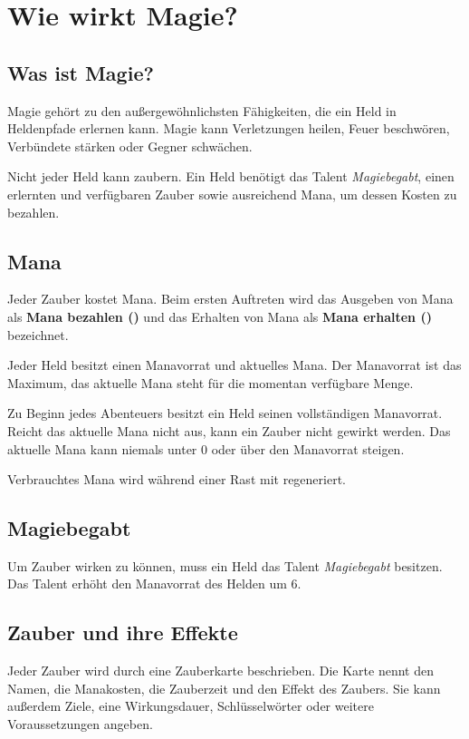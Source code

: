 \chapter{Wie wirkt Magie?}
\label{chap:magic}

\section{Was ist Magie?}

Magie gehört zu den außergewöhnlichsten Fähigkeiten, die ein Held in Heldenpfade erlernen kann. Magie kann Verletzungen heilen, Feuer beschwören, Verbündete stärken oder Gegner schwächen.

Nicht jeder Held kann zaubern. Ein Held benötigt das Talent \emph{Magiebegabt}, einen erlernten und verfügbaren Zauber sowie ausreichend Mana, um dessen Kosten zu bezahlen.

\section{Mana}

Jeder Zauber kostet Mana. Beim ersten Auftreten wird das Ausgeben von Mana als \textbf{Mana bezahlen (\manaLoss)} und das Erhalten von Mana als \textbf{Mana erhalten (\manaGain)} bezeichnet.

Jeder Held besitzt einen Manavorrat und aktuelles Mana. Der Manavorrat ist das Maximum, das aktuelle Mana steht für die momentan verfügbare Menge.

Zu Beginn jedes Abenteuers besitzt ein Held seinen vollständigen Manavorrat. Reicht das aktuelle Mana nicht aus, kann ein Zauber nicht gewirkt werden. Das aktuelle Mana kann niemals unter 0 oder über den Manavorrat steigen.

Verbrauchtes Mana wird während einer Rast mit \manaGain{} regeneriert.

\section{Magiebegabt}

Um Zauber wirken zu können, muss ein Held das Talent \emph{Magiebegabt} besitzen. Das Talent erhöht den Manavorrat des Helden um 6.

\section{Zauber und ihre Effekte}

Jeder Zauber wird durch eine Zauberkarte beschrieben. Die Karte nennt den Namen, die Manakosten, die Zauberzeit und den Effekt des Zaubers. Sie kann außerdem Ziele, eine Wirkungsdauer, Schlüsselwörter oder weitere Voraussetzungen angeben.

